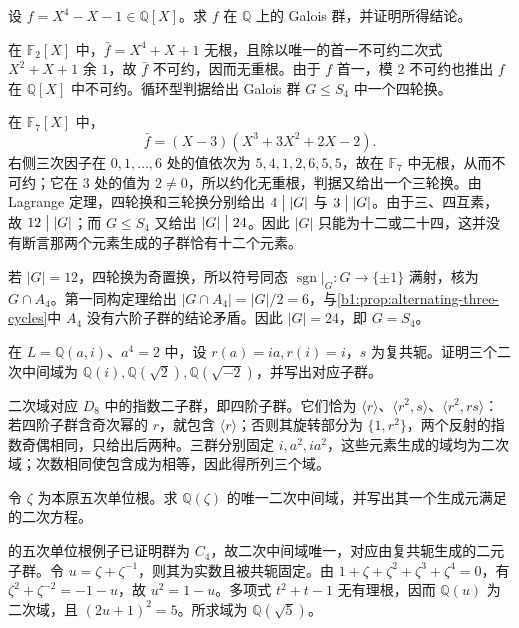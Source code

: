 \begin{exercise}\label{b1:ex:19-mod-primes-s4}
	设 \(f=X^4-X-1\in\mathbb Q[X]\)。求 \(f\) 在 \(\mathbb Q\) 上的 Galois 群，并证明所得结论。
\end{exercise}
\begin{solution}
	在 \(\mathbb F_2[X]\) 中，\(\bar f=X^4+X+1\) 无根，且除以唯一的首一不可约二次式 \(X^2+X+1\) 余 \(1\)，故 \(\bar f\) 不可约，因而无重根。由于 \(f\) 首一，模 \(2\) 不可约也推出 \(f\) 在 \(\mathbb Q[X]\) 中不可约。循环型判据给出 Galois 群 \(G\leq S_4\) 中一个四轮换。

	在 \(\mathbb F_7[X]\) 中，
	\[
		\bar f=(X-3)(X^3+3X^2+2X-2).
	\]
	右侧三次因子在 \(0,1,\ldots,6\) 处的值依次为 \(5,4,1,2,6,5,5\)，故在 \(\mathbb F_7\) 中无根，从而不可约；它在 \(3\) 处的值为 \(2\ne0\)，所以约化无重根，判据又给出一个三轮换。由 Lagrange 定理，四轮换和三轮换分别给出 \(4\bigm\vert|G|\) 与 \(3\bigm\vert|G|\)。由于三、四互素，故 \(12\bigm\vert|G|\)；而 \(G\leq S_4\) 又给出 \(|G|\bigm\vert24\)。因此 \(|G|\) 只能为十二或二十四，这并没有断言那两个元素生成的子群恰有十二个元素。

	若 \(|G|=12\)，四轮换为奇置换，所以符号同态 \(\operatorname{sgn}|_G:G\rightarrow\{\pm1\}\) 满射，核为 \(G\cap A_4\)。第一同构定理给出 \(|G\cap A_4|=|G|/2=6\)，与\cref{b1:prop:alternating-three-cycles}中 \(A_4\) 没有六阶子群的结论矛盾。因此 \(|G|=24\)，即 \(G=S_4\)。
\end{solution}

\begin{exercise}\label{b1:ex:19-dihedral-quadratics}
	在 \(L=\mathbb Q(a,i)\)、\(a^4=2\) 中，设 \(r(a)=ia,r(i)=i\)，\(s\) 为复共轭。证明三个二次中间域为 \(\mathbb Q(i),\mathbb Q(\sqrt2),\mathbb Q(\sqrt{-2})\)，并写出对应子群。
\end{exercise}
\begin{solution}
	二次域对应 \(D_8\) 中的指数二子群，即四阶子群。它们恰为 \(\langle r\rangle\)、\(\langle r^2,s\rangle\)、\(\langle r^2,rs\rangle\)：若四阶子群含奇次幂的 \(r\)，就包含 \(\langle r\rangle\)；否则其旋转部分为 \(\{1,r^2\}\)，两个反射的指数奇偶相同，只给出后两种。三群分别固定 \(i,a^2,ia^2\)，这些元素生成的域均为二次域；次数相同使包含成为相等，因此得所列三个域。
\end{solution}

\begin{exercise}\label{b1:ex:19-cyclotomic-five}
	令 \(\zeta\) 为本原五次单位根。求 \(\mathbb Q(\zeta)\) 的唯一二次中间域，并写出其一个生成元满足的二次方程。
\end{exercise}
\begin{solution}
	的五次单位根例子已证明群为 \(C_4\)，故二次中间域唯一，对应由复共轭生成的二元子群。令 \(u=\zeta+\zeta^{-1}\)，则其为实数且被共轭固定。由 \(1+\zeta+\zeta^2+\zeta^3+\zeta^4=0\)，有 \(\zeta^2+\zeta^{-2}=-1-u\)，故 \(u^2=1-u\)。多项式 \(t^2+t-1\) 无有理根，因而 \(\mathbb Q(u)\) 为二次域，且 \((2u+1)^2=5\)。所求域为 \(\mathbb Q(\sqrt5)\)。
\end{solution}

